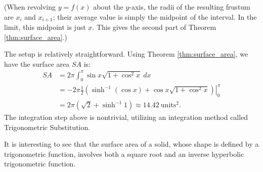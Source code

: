 (When revolving $y=f(x)$ about the $y$-axis, the radii of the resulting frustum are $x_i$ and $x_{i+1}$; their average value is simply the midpoint of the interval. In the limit, this midpoint is just $x$. This gives the second part of Theorem \ref{thm:surface_area}.)\\

{The setup is relatively straightforward. Using Theorem \ref{thm:surface_area}, we have the surface area $SA$ is:
\begin{align*}
SA  &=	2\pi\int_0^\pi \sin x\sqrt{1+\cos^2x}\ dx \\
		&=	-2\pi\frac12\left.\left(\sinh^{-1}(\cos x)+\cos x\sqrt{1+\cos^2x}\right)\right|_0^\pi \\
		&= 2\pi\left(\sqrt{2}+\sinh^{-1} 1\right) \approx 14.42\ \text{units}^2.%
\end{align*}
The integration step above is nontrivial, utilizing an integration method called Trigonometric Substitution. 

It is interesting to see that the surface area of a solid, whose shape is defined by a trigonometric function, involves both a square root and an inverse hyperbolic trigonometric function.
}\\

